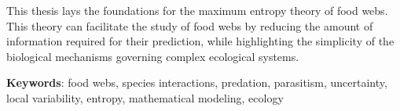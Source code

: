 \documentclass[12pt,twoside,phd]{dms}
\numberwithin{equation}{section}
\numberwithin{table}{chapter}
\numberwithin{figure}{chapter}
\begin{document}
This thesis lays the foundations for the maximum entropy theory of food webs.
This theory can facilitate the study of food webs by reducing the amount of
information required for their prediction, while highlighting the simplicity of
the biological mechanisms governing complex ecological systems.

\textbf{Keywords}: food webs, species interactions, predation, parasitism,
uncertainty, local variability, entropy, mathematical modeling, ecology


\francais
\cleardoublepage
{}  %

\setlength{\parskip}{0pt}%

\tableofcontents
\cleardoublepage
{}  %
\listoftables
\cleardoublepage
{}
\listoffigures


\end{document}
